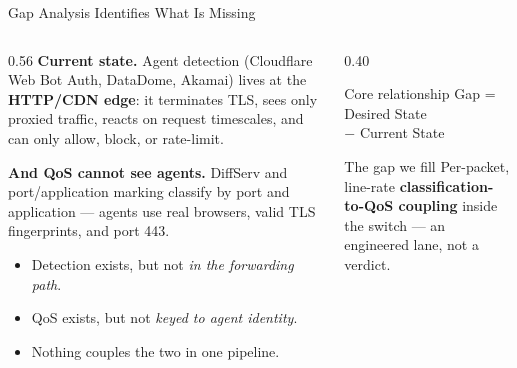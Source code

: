 \documentclass[aspectratio=169,11pt]{beamer}
\begin{document}
\begin{frame}{Gap Analysis Identifies What Is Missing}
  \begin{columns}[T, onlytextwidth]
    \begin{column}{0.56\textwidth}
      \small
      \textbf{Current state.} Agent detection (Cloudflare Web Bot Auth, DataDome, Akamai) lives at
      the \textbf{HTTP/CDN edge}: it terminates TLS, sees only proxied traffic, reacts on request
      timescales, and can only allow, block, or rate-limit.
      \medskip

      \textbf{And QoS cannot see agents.} DiffServ and port/application marking classify by port
      and application --- agents use real browsers, valid TLS fingerprints, and port 443.
      \medskip

      \begin{itemize}
        \item Detection exists, but not \emph{in the forwarding path}.
        \item QoS exists, but not \emph{keyed to agent identity}.
        \item Nothing couples the two in one pipeline.
      \end{itemize}
    \end{column}
    \begin{column}{0.40\textwidth}
      \begin{block}{Core relationship}
        \centering\large
        Gap = Desired State\\[0.25em]
        $-$ Current State
      \end{block}
      \begin{alertblock}{The gap we fill}
        \small Per-packet, line-rate \textbf{classification-to-QoS coupling} inside the switch ---
        an engineered lane, not a verdict.
      \end{alertblock}
    \end{column}
  \end{columns}
\end{frame}
\end{document}
